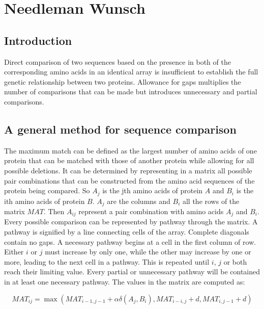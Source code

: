 \graphicspath{{chapters/01/images}}
\chapter{Needleman Wunsch}

\section{Introduction}
Direct comparison of two sequences based on the presence in both of the corresponding amino acids in an identical array is insufficient to establish the full genetic relationship between two proteins.
Allowance for gaps multiplies the number of comparisons that can be made but introduces unnecessary and partial comparisons.

\section{A general method for sequence comparison}
The maximum match can be defined as the largest number of amino acids of one protein that can be matched with those of another protein while allowing for all possible deletions.
It can be determined by representing in a matrix all possible pair combinations that can be constructed from the amino acid sequences of the protein being compared.
So $A_j$ is the jth amino acids of protein $A$ and $B_i$ is the ith amino acids of protein $B$.
$A_j$ are the columns and $B_i$ all the rows of the matrix $MAT$.
Then $A_{ij}$ represent a pair combination with amino acids $A_j$ and $B_i$.
Every possible comparison can be represented by pathway through the matrix.
A pathway is signified by a line connecting cells of the array.
Complete diagonals contain no gaps.
A necessary pathway begins at a cell in the first column of row.
Either $i$ or $j$ must increase by only one, while the other may increase by one or more, leading to the next cell in a pathway.
This is repeated until $i$, $j$ or both reach their limiting value.
Every partial or unnecessary pathway will be contained in at least one necessary pathway.
The values in the matrix are computed as:

$$MAT_{ij} = \max(MAT_{i-1, j-1} + \alpha\delta(A_j, B_i), MAT_{i-i, j} + d, MAT_{i,j-1} + d)$$

